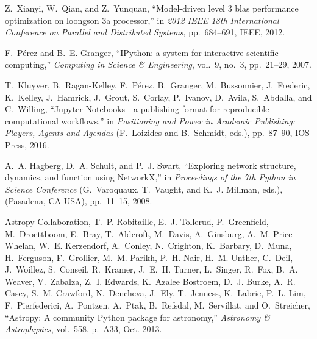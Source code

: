 \documentclass[twocolumn]{article}
\begin{document}
\begin{thebibliography}{10}
Z.~Xianyi, W.~Qian, and Z.~Yunquan, ``Model-driven level 3 blas performance
  optimization on loongson 3a processor,'' in {\em 2012 IEEE 18th International
  Conference on Parallel and Distributed Systems}, pp.~684--691, IEEE, 2012.

F.~P{\'e}rez and B.~E. Granger, ``{IP}ython: a system for interactive
  scientific computing,'' {\em Computing in Science \& Engineering}, vol.~9,
  no.~3, pp.~21--29, 2007.

T.~Kluyver, B.~Ragan-Kelley, F.~P{\'e}rez, B.~Granger, M.~Bussonnier,
  J.~Frederic, K.~Kelley, J.~Hamrick, J.~Grout, S.~Corlay, P.~Ivanov, D.~Avila,
  S.~Abdalla, and C.~Willing, ``{Jupyter Notebooks}---a publishing format for
  reproducible computational workflows,'' in {\em Positioning and Power in
  Academic Publishing: Players, Agents and Agendas} (F.~Loizides and
  B.~Schmidt, eds.), pp.~87--90, IOS Press, 2016.

A.~A. Hagberg, D.~A. Schult, and P.~J. Swart, ``Exploring network structure,
  dynamics, and function using {NetworkX},'' in {\em Proceedings of the 7th
  Python in Science Conference} (G.~Varoquaux, T.~Vaught, and K.~J. Millman,
  eds.), (Pasadena, CA USA), pp.~11--15, 2008.

{Astropy Collaboration}, T.~P. {Robitaille}, E.~J. {Tollerud}, P.~{Greenfield},
  M.~{Droettboom}, E.~{Bray}, T.~{Aldcroft}, M.~{Davis}, A.~{Ginsburg}, A.~M.
  {Price-Whelan}, W.~E. {Kerzendorf}, A.~{Conley}, N.~{Crighton}, K.~{Barbary},
  D.~{Muna}, H.~{Ferguson}, F.~{Grollier}, M.~M. {Parikh}, P.~H. {Nair}, H.~M.
  {Unther}, C.~{Deil}, J.~{Woillez}, S.~{Conseil}, R.~{Kramer}, J.~E.~H.
  {Turner}, L.~{Singer}, R.~{Fox}, B.~A. {Weaver}, V.~{Zabalza}, Z.~I.
  {Edwards}, K.~{Azalee Bostroem}, D.~J. {Burke}, A.~R. {Casey}, S.~M.
  {Crawford}, N.~{Dencheva}, J.~{Ely}, T.~{Jenness}, K.~{Labrie}, P.~L. {Lim},
  F.~{Pierfederici}, A.~{Pontzen}, A.~{Ptak}, B.~{Refsdal}, M.~{Servillat}, and
  O.~{Streicher}, ``{Astropy: A community Python package for astronomy},'' {\em
  Astronomy \& Astrophysics}, vol.~558, p.~A33, Oct. 2013.


\end{thebibliography}
\end{document}
